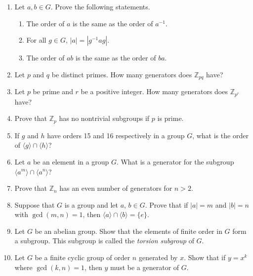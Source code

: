 \documentclass[12pt,reqno]{amsart}
\newcommand{\boldemph}{\emph}
\begin{document}
\begin{enumerate}[{\bf 1.}]
 
\item
Let $a, b \in G$.  Prove the following statements.
\begin{enumerate}
 
 \item
The order of $a$ is the same as the order of $a^{-1}$.
 
 \item
For all $g \in G$, $|a| = |g^{-1}ag|$.
 
 \item
The order of $ab$ is the same as the order of $ba$.
 
\end{enumerate}
 
 
\item
Let $p$ and $q$ be distinct primes.  How many generators does ${\mathbb
Z}_{pq}$ have? 
 
 
\item
Let $p$ be prime and $r$ be a positive integer.  How many generators
does ${\mathbb Z}_{p^r}$ have? 
 
 
\item
Prove that  ${\mathbb Z}_{p}$ has no nontrivial subgroups if $p$ is
prime. 
 
 
\item
If $g$ and $h$ have orders 15 and 16 respectively in a group $G$, what
is the order of $\langle g \rangle  \cap \langle h \rangle $? 
 
 
\item
Let $a$ be an element in a group $G$. What is a generator for the
subgroup $\langle a^m \rangle  \cap  \langle a^n \rangle $?
 
 
\item
Prove that ${\mathbb Z}_n$ has an even number of generators for $n > 2$. 
 
 
\item
Suppose that $G$ is a group and let $a$, $b \in G$. Prove that if $|a|
= m$ and $|b| = n$ with $\gcd(m,n) = 1$, then $\langle a \rangle  \cap
\langle b \rangle  = \{ e \}$. 
 
 
\item
Let $G$ be an abelian group. Show that the elements of finite order in
$G$ form a subgroup. This subgroup is called the \boldemph{torsion
subgroup} of $G$. 
 
 
\item
Let $G$ be a finite cyclic group of order $n$ generated by $x$. Show
that if $y = x^k$ where $\gcd(k,n) = 1$, then $y$ must be a generator
of $G$.
 

\end{enumerate}
\end{document}
